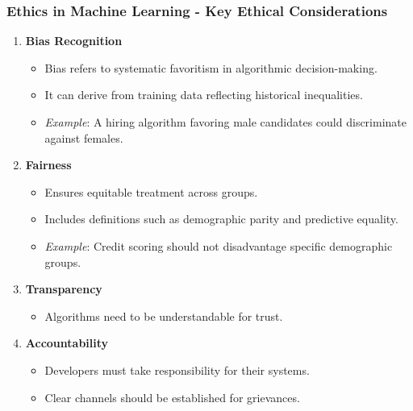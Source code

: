 \documentclass{beamer}
\begin{document}
\begin{frame}[fragile]
    \frametitle{Ethics in Machine Learning - Key Ethical Considerations}
    \begin{enumerate}
        \item \textbf{Bias Recognition}
            \begin{itemize}
                \item Bias refers to systematic favoritism in algorithmic decision-making.
                \item It can derive from training data reflecting historical inequalities.
                \item \textit{Example}: A hiring algorithm favoring male candidates could discriminate against females.
            \end{itemize}

        \item \textbf{Fairness}
            \begin{itemize}
                \item Ensures equitable treatment across groups.
                \item Includes definitions such as demographic parity and predictive equality.
                \item \textit{Example}: Credit scoring should not disadvantage specific demographic groups.
            \end{itemize}

        \item \textbf{Transparency}
            \begin{itemize}
                \item Algorithms need to be understandable for trust.
            \end{itemize}

        \item \textbf{Accountability}
            \begin{itemize}
                \item Developers must take responsibility for their systems.
                \item Clear channels should be established for grievances.
            \end{itemize}
    \end{enumerate}
\end{frame}
\end{document}
